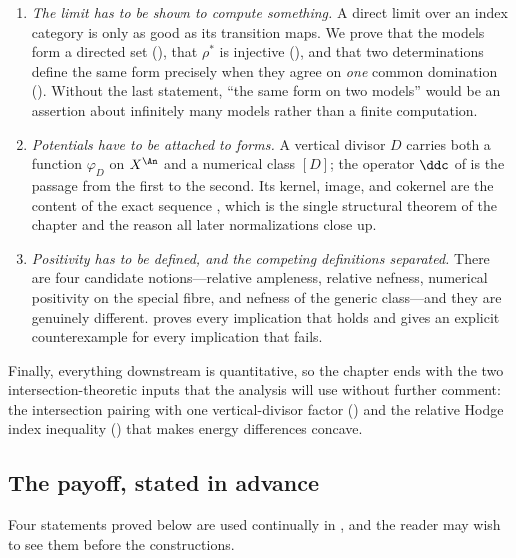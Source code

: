 \begin{enumerate}
\item\label{itm:ch20-plan:limit}
 \emph{The limit has to be shown to compute something.}  A direct limit over
 an index category is only as good as its transition maps.  We prove that
 the models form a directed set (), that
 $\rho^*$ is injective (), and that two
 determinations define the same form precisely when they agree on
 \emph{one} common domination
 ().  Without the last statement,
 ``the same form on two models'' would be an assertion about infinitely many
 models rather than a finite computation.
\item\label{itm:ch20-plan:ddc}
 \emph{Potentials have to be attached to forms.}  A vertical divisor $D$
 carries both a function $\varphi_D$ on $X^{\An}$ and a numerical class
 $[D]$; the operator $\ddc$ of  is the passage from
 the first to the second.  Its kernel, image, and cokernel are the content
 of the exact sequence , which is the single
 structural theorem of the chapter and the reason all later normalizations
 close up.
\item\label{itm:ch20-plan:positivity}
 \emph{Positivity has to be defined, and the competing definitions
 separated.}  There are four candidate notions---relative ampleness,
 relative nefness, numerical positivity on the special fibre, and nefness of
 the generic class---and they are genuinely different.
  proves every implication that holds and gives an
 explicit counterexample for every implication that fails.
\end{enumerate}

Finally, everything downstream is quantitative, so the chapter ends with the
two intersection-theoretic inputs that the analysis will use without further
comment: the intersection pairing with one vertical-divisor factor
() and the relative Hodge index inequality
() that makes energy differences concave.

\subsection{The payoff, stated in advance}
\label{sec:ch20-payoff}

Four statements proved below are used continually in
, and the reader may wish to see
them before the constructions.

